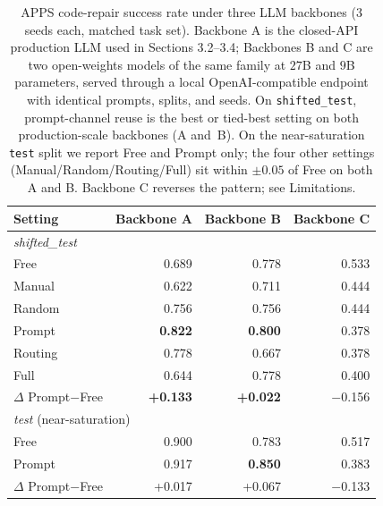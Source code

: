 \begin{table}[t]
\centering
\small
\setlength{\tabcolsep}{4pt}
\begin{tabular}{lrrr}
\toprule
Setting & Backbone A & Backbone B & Backbone C \\
\midrule
\multicolumn{4}{l}{\emph{shifted\_test}} \\
Free            & 0.689 & 0.778 & 0.533 \\
Manual          & 0.622 & 0.711 & 0.444 \\
Random          & 0.756 & 0.756 & 0.444 \\
Prompt          & \textbf{0.822} & \textbf{0.800} & 0.378 \\
Routing         & 0.778 & 0.667 & 0.378 \\
Full            & 0.644 & 0.778 & 0.400 \\
$\Delta$ Prompt$-$Free & \textbf{+0.133} & \textbf{+0.022} & $-$0.156 \\
\midrule
\multicolumn{4}{l}{\emph{test} (near-saturation)} \\
Free            & 0.900 & 0.783 & 0.517 \\
Prompt          & 0.917 & \textbf{0.850} & 0.383 \\
$\Delta$ Prompt$-$Free & +0.017 & +0.067 & $-$0.133 \\
\bottomrule
\end{tabular}
\caption{{APPS} code-repair success rate under three {LLM} backbones (3 seeds each, matched task set). Backbone A is the closed-API production {LLM} used in Sections 3.2--3.4; Backbones B and C are two open-weights models of the same family at $27$B and $9$B parameters, served through a local OpenAI-compatible endpoint with identical prompts, splits, and seeds. On \texttt{shifted\_test}, prompt-channel reuse is the best or tied-best setting on both production-scale backbones (A and~B). On the near-saturation \texttt{test} split we report Free and Prompt only; the four other settings (Manual/Random/Routing/Full) sit within $\pm 0.05$ of Free on both A and B. Backbone C reverses the pattern; see Limitations.}
\label{tab:apps-cross-model}
\end{table}

